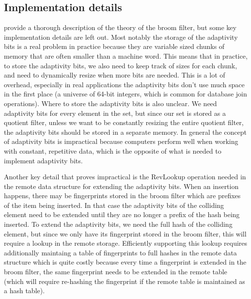 \documentclass[../paper.tex]{subfiles}
\begin{document}
\subsection{Implementation details}

\cite{broom-filter} provide a thorough description of the theory of
the broom filter, but some key implementation details are left out.
Most notably the storage of the adaptivity bits is a real problem
in practice because they are variable sized chunks of memory that
are often smaller than a machine word. This means that in practice,
to store the adaptivity bits, we also need to keep track of sizes
for each chunk, and need to dynamically resize when more bits are needed.
This is a lot of overhead, especially in real applications the adaptivity
bits don't use much space in the first place (a universe of 64-bit integers,
which is common for database join operations). Where to store the adaptivity
bits is also unclear. We need adaptivity bits for every element in
the set, but since our set is stored as a quotient filter, unless
we want to be constantly resizing the entire quotient filter, the
adaptivity bits should be stored in a separate memory. In general
the concept of adaptivity bits is impractical because computers perform
well when working with constant, repetitive data, which is the opposite
of what is needed to implement adaptivity bits.

Another key detail that proves impractical is the RevLookup operation
needed in the remote data structure for extending the adaptivity bits. When
an insertion happens, there may be fingerprints stored in the broom filter
which are prefixes of the item being inserted. In that case the adaptivity
bits of the colliding element need to be extended until they are no longer
a prefix of the hash being inserted. To extend the adaptivity bits, we
need the full hash of the colliding element, but since we only have its
fingerprint stored in the broom filter, this will require a lookup in
the remote storage. Efficiently supporting this lookup requires additionally
maintaing a table of fingerprints to full hashes in the remote data structure
which is quite costly because every time a fingerprint is extended in the
broom filter, the same fingerprint needs to be extended in the remote table
(which will require re-hashing the fingerprint if the remote table is maintained
as a hash table).
\end{document}
